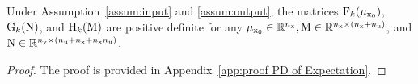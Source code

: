 \begin{proposition}\label{pro: PD for expectation}
    Under Assumption~\ref{assum:input} and \ref{assum:output}, the matrices $\mxF_k(\mu_{\vcx_0})$, $\mxG_k(\mxN)$, and $\mxH_k(\mxM)$ are positive definite for any $\mu_{\vcx_0} \in \Rbb^{\Nx}, \mxM \in \Rbb^{\Nx \times (\Nx + \Nu)}$, and $\mxN \in \Rbb^{\Ny \times (\Nu + \Nx + \Nx\Nu)}$.
\end{proposition}
\begin{proof}
    The proof is provided in Appendix~\ref{app:proof PD of Expectation}.
\end{proof}
